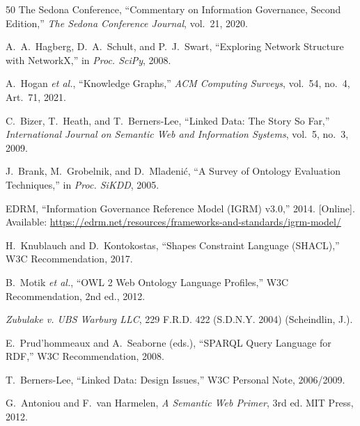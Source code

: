 \documentclass{ieeeaccess}
\begin{document}
\begin{thebibliography}{50}
The Sedona Conference, ``Commentary on Information Governance, Second Edition,'' \textit{The Sedona Conference Journal}, vol.~21, 2020.

A.~A.~Hagberg, D.~A.~Schult, and P.~J.~Swart, ``Exploring Network Structure with NetworkX,'' in \textit{Proc. SciPy}, 2008.

A.~Hogan \textit{et al.}, ``Knowledge Graphs,'' \textit{ACM Computing Surveys}, vol.~54, no.~4, Art.~71, 2021.

C.~Bizer, T.~Heath, and T.~Berners-Lee, ``Linked Data: The Story So Far,'' \textit{International Journal on Semantic Web and Information Systems}, vol.~5, no.~3, 2009.

J.~Brank, M.~Grobelnik, and D.~Mladeni\'{c}, ``A Survey of Ontology Evaluation Techniques,'' in \textit{Proc. SiKDD}, 2005.

EDRM, ``Information Governance Reference Model (IGRM) v3.0,'' 2014. [Online]. Available: \url{https://edrm.net/resources/frameworks-and-standards/igrm-model/}

H.~Knublauch and D.~Kontokostas, ``Shapes Constraint Language (SHACL),'' W3C Recommendation, 2017.

B.~Motik \textit{et al.}, ``OWL 2 Web Ontology Language Profiles,'' W3C Recommendation, 2nd ed., 2012.

\textit{Zubulake v. UBS Warburg LLC}, 229 F.R.D. 422 (S.D.N.Y. 2004) (Scheindlin, J.).

E.~Prud'hommeaux and A.~Seaborne (eds.), ``SPARQL Query Language for RDF,'' W3C Recommendation, 2008.

T.~Berners-Lee, ``Linked Data: Design Issues,'' W3C Personal Note, 2006/2009.

G.~Antoniou and F.~van Harmelen, \textit{A Semantic Web Primer}, 3rd ed. MIT Press, 2012.

\end{thebibliography}
\end{document}
